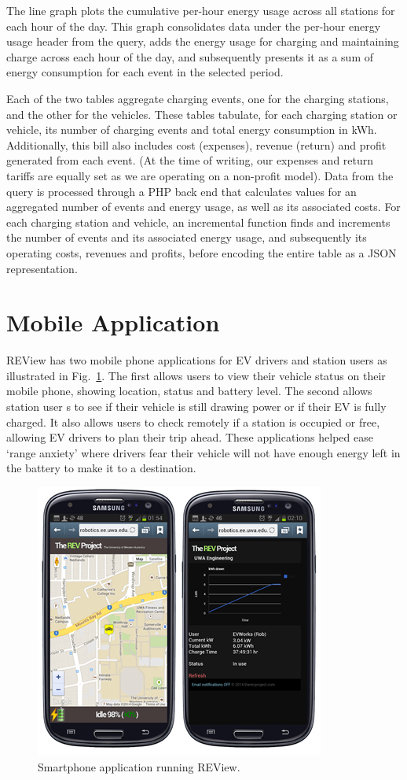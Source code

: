 The line graph plots the cumulative per-hour energy usage across all stations for each hour of the day. This graph consolidates data under the per-hour energy usage header from the query, adds the energy usage for charging and maintaining charge across each hour of the day, and subsequently presents it as a sum of energy consumption for each event in the selected period. 

Each of the two tables aggregate charging events, one for the charging stations, and the other for the vehicles. These tables tabulate, for each charging station or vehicle, its number of charging events and total energy consumption in kWh. Additionally, this bill also includes cost (expenses), revenue (return) and profit generated from each event. (At the time of writing, our expenses and return tariffs are equally set as we are operating on a non-profit model). Data from the query is processed through a PHP back end that calculates values for an aggregated number of events and energy usage, as well as its associated costs. For each charging station and vehicle, an incremental function finds and increments the number of events and its associated energy usage, and subsequently its operating costs, revenues and profits, before encoding the entire table as a JSON representation.

\section{Mobile Application}
\label{sec:9:app}
REView has two mobile phone applications for EV drivers and station users as illustrated in Fig.~\ref{fig:9:app}. The first allows users to view their vehicle status on their mobile phone, showing location, status and battery level. The second allows station user s to see if their vehicle is still drawing power or if their EV is fully charged. It also allows users to check remotely if a station is occupied or free, allowing EV drivers to plan their trip ahead. These applications helped ease ‘range anxiety’ where drivers fear their vehicle will not have enough energy left in the battery to make it to a destination.

\begin{figure}[H]
	\centering
	\includegraphics[width=0.7\linewidth]{smartphone}
	\caption{Smartphone application running REView.}
	\label{fig:9:app}
\end{figure}


